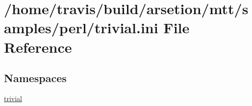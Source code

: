 \hypertarget{trivial_8ini}{\section{/home/travis/build/arsetion/mtt/samples/perl/trivial.ini File Reference}
\label{trivial_8ini}
}
\subsection*{Namespaces}
\begin{DoxyCompactItemize}
\item 
\hyperlink{namespacetrivial}{trivial}
\end{DoxyCompactItemize}
